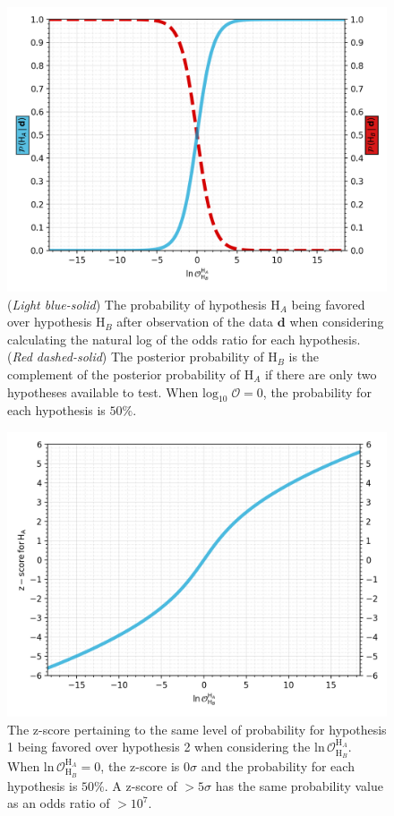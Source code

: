 \newpage
\begin{figure}[th]
  \includegraphics[width=\textwidth]{figs/chapter5/log_odds_probability.png}
  \caption{(\textit{Light blue-solid}) The probability of hypothesis $\mathrm{H}_A$ being favored over hypothesis $\mathrm{H}_B$ after observation of the data $\mathbf{d}$ when considering calculating the natural log of the odds ratio for each hypothesis. (\textit{Red dashed-solid}) The posterior probability of $\mathrm{H}_B$ is the complement of the posterior probability of $\mathrm{H}_A$ if there are only two hypotheses available to test. When $\mathrm{log}_{10} \; \mathcal{O} = 0$, the probability for each hypothesis is $50\%$.}
  \label{fig:log_odds_v_probability}
\end{figure}

\begin{figure}[th]
  \includegraphics[width=\textwidth]{figs/chapter5/log_odds_z_score.png}
  \caption{The z-score pertaining to the same level of probability for  hypothesis 1 being favored over hypothesis 2 when considering the $\mathrm{ln} \, \mathcal{O}^{\mathrm{H}_A}_{\mathrm{H}_B}$. When $\mathrm{ln} \, \mathcal{O}^{\mathrm{H}_A}_{\mathrm{H}_B} = 0$, the z-score is $0 \sigma$ and the probability for each hypothesis is $50\%$. A z-score of $>5 \sigma$ has the same probability value as an odds ratio of $> 10^7$.}
  \label{fig:log_odds_v_z_score}
\end{figure}


